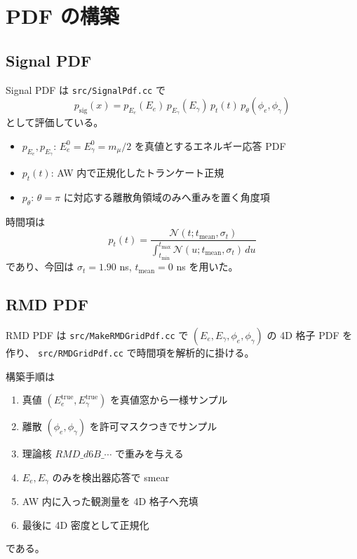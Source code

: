\documentclass[a4paper,11pt]{jsarticle}
\begin{document}
\section{PDF の構築}
\subsection{Signal PDF}
Signal PDF は \texttt{src/SignalPdf.cc} で
\begin{equation}
p_{\mathrm{sig}}(x)=p_{E_e}(E_e)\,p_{E_\gamma}(E_\gamma)\,p_t(t)\,p_\theta(\phi_e,\phi_\gamma)
\end{equation}
として評価している。

\begin{itemize}
  \item \(p_{E_e},p_{E_\gamma}\): \(E_e^0=E_\gamma^0=m_\mu/2\) を真値とするエネルギー応答 PDF
  \item \(p_t(t)\): AW 内で正規化したトランケート正規
  \item \(p_\theta\): \(\theta=\pi\) に対応する離散角領域のみへ重みを置く角度項
\end{itemize}

時間項は
\begin{equation}
p_t(t)=
\frac{\mathcal{N}(t;t_{\mathrm{mean}},\sigma_t)}
{\int_{t_{\min}}^{t_{\max}}\mathcal{N}(u;t_{\mathrm{mean}},\sigma_t)\,du}
\end{equation}
であり、今回は \(\sigma_t=1.90\) ns, \(t_{\mathrm{mean}}=0\) ns を用いた。

\subsection{RMD PDF}
RMD PDF は \texttt{src/MakeRMDGridPdf.cc} で
\((E_e,E_\gamma,\phi_e,\phi_\gamma)\) の 4D 格子 PDF を作り、
\texttt{src/RMDGridPdf.cc} で時間項を解析的に掛ける。

構築手順は
\begin{enumerate}
  \item 真値 \((E_e^{\mathrm{true}},E_\gamma^{\mathrm{true}})\) を真値窓から一様サンプル
  \item 離散 \((\phi_e,\phi_\gamma)\) を許可マスクつきでサンプル
  \item 理論核 \(RMD\_d6B\_\cdots\) で重みを与える
  \item \(E_e,E_\gamma\) のみを検出器応答で smear
  \item AW 内に入った観測量を 4D 格子へ充填
  \item 最後に 4D 密度として正規化
\end{enumerate}
である。
\end{document}
